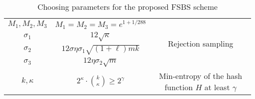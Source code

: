 \documentclass[runningheads]{llncs}
\begin{document}
\begin{table}[t]
\begin{center}
\begin{tabular}{ |c|c| c|}
			$M_1,M_2,M_3$&$M_1=M_2=M_3=e^{1+1/288}$& \multirow{4}{*}{Rejection sampling}\\
			
			$\sigma_1$&$12\sqrt{\kappa}$&\\
		
			$\sigma_2$&$12\sigma\eta\sigma_1\sqrt{(1+\ell)mk}$&\\
			
			$\sigma_3$&$12\eta\sigma_2\sqrt{m}$&\\
			
			\hline
				$k,\kappa$& $2^{\kappa}\cdot {{k}\choose{\kappa}}  \geq 2^{\gamma} $&\makecell{Min-entropy of the hash \\function $H$ at least $\gamma$}\\
						\hline
			\hline 
		\end{tabular} 
	\end{center}
	\caption{Choosing parameters for the proposed \textsf{FSBS} scheme}
	\label{tab3}
\end{table} 
\vspace{-5mm}
\end{document}
